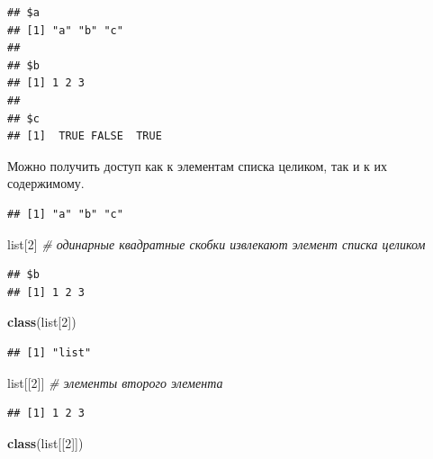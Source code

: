 \documentclass[
]{book}
\newenvironment{Shaded}{\begin{snugshade}}{\end{snugshade}}
\newcommand{\CommentTok}[1]{\textcolor[rgb]{0.56,0.35,0.01}{\textit{#1}}}
\newcommand{\DecValTok}[1]{\textcolor[rgb]{0.00,0.00,0.81}{#1}}
\newcommand{\FunctionTok}[1]{\textcolor[rgb]{0.13,0.29,0.53}{\textbf{#1}}}
\newcommand{\NormalTok}[1]{#1}
\newcommand{\SpecialCharTok}[1]{\textcolor[rgb]{0.81,0.36,0.00}{\textbf{#1}}}
\theoremstyle{definition}
\theoremstyle{definition}
\theoremstyle{definition}
\theoremstyle{definition}
\theoremstyle{remark}
\begin{document}
\begin{verbatim}
## $a
## [1] "a" "b" "c"
## 
## $b
## [1] 1 2 3
## 
## $c
## [1]  TRUE FALSE  TRUE
\end{verbatim}

Можно получить доступ как к элементам списка целиком, так и к их содержимому.

\begin{Shaded}
\end{Shaded}

\begin{verbatim}
## [1] "a" "b" "c"
\end{verbatim}

\begin{Shaded}
\begin{Highlighting}[]
\NormalTok{list[}\DecValTok{2}\NormalTok{] }\CommentTok{\# одинарные квадратные скобки извлекают элемент списка целиком}
\end{Highlighting}
\end{Shaded}

\begin{verbatim}
## $b
## [1] 1 2 3
\end{verbatim}

\begin{Shaded}
\begin{Highlighting}[]
\FunctionTok{class}\NormalTok{(list[}\DecValTok{2}\NormalTok{])}
\end{Highlighting}
\end{Shaded}

\begin{verbatim}
## [1] "list"
\end{verbatim}

\begin{Shaded}
\begin{Highlighting}[]
\NormalTok{list[[}\DecValTok{2}\NormalTok{]] }\CommentTok{\#  элементы второго элемента }
\end{Highlighting}
\end{Shaded}

\begin{verbatim}
## [1] 1 2 3
\end{verbatim}

\begin{Shaded}
\begin{Highlighting}[]
\FunctionTok{class}\NormalTok{(list[[}\DecValTok{2}\NormalTok{]])}
\end{Highlighting}
\end{Shaded}
\end{document}
